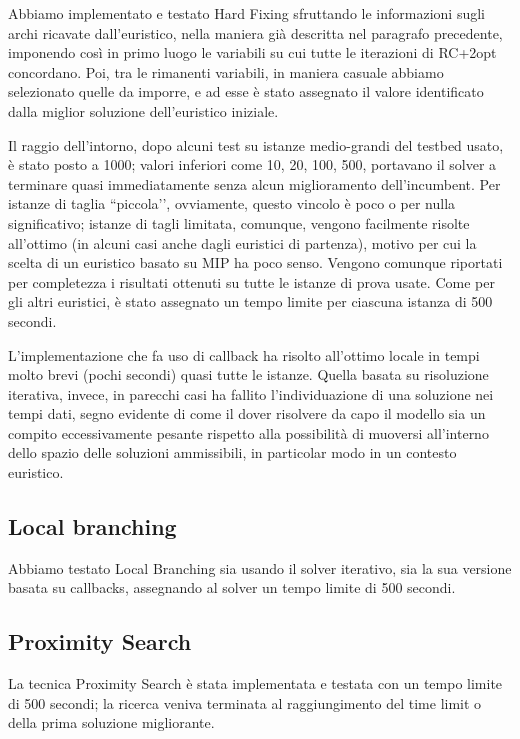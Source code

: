 Abbiamo implementato e testato Hard Fixing sfruttando le informazioni sugli archi ricavate dall’euristico, nella maniera già descritta nel paragrafo precedente, imponendo così in primo luogo le variabili su cui tutte le iterazioni di RC+2opt concordano. Poi, tra le rimanenti variabili, in maniera casuale abbiamo selezionato quelle da imporre, e ad esse è stato assegnato il valore identificato dalla miglior soluzione dell’euristico iniziale.

Il raggio dell’intorno, dopo alcuni test su istanze medio-grandi del testbed usato, è stato posto a 1000; valori inferiori come 10, 20, 100, 500, portavano il solver a terminare quasi immediatamente senza alcun miglioramento dell’incumbent. Per istanze di taglia ``piccola’’, ovviamente, questo vincolo è poco o per nulla significativo; istanze di tagli limitata, comunque, vengono facilmente risolte all’ottimo (in alcuni casi anche dagli euristici di partenza), motivo per cui la scelta di un euristico basato su MIP ha poco senso. Vengono comunque riportati per completezza i risultati ottenuti su tutte le istanze di prova usate. Come per gli altri euristici, è stato assegnato un tempo limite per ciascuna istanza di 500 secondi.

L’implementazione che fa uso di callback ha risolto all’ottimo locale in tempi molto brevi (pochi secondi) quasi tutte le istanze. Quella basata su risoluzione iterativa, invece, in parecchi casi ha fallito l’individuazione di una soluzione nei tempi dati, segno evidente di come il dover risolvere da capo il modello sia un compito eccessivamente pesante rispetto alla possibilità di muoversi all’interno dello spazio delle soluzioni ammissibili, in particolar modo in un contesto euristico.

\subsection{Local branching}
Abbiamo testato Local Branching sia usando il solver iterativo, sia la sua versione basata su callbacks, assegnando al solver un tempo limite di 500 secondi.

\subsection{Proximity Search}
La tecnica Proximity Search è stata implementata e testata con un tempo limite di 500 secondi; la ricerca veniva terminata al raggiungimento del time limit o della prima soluzione migliorante.

